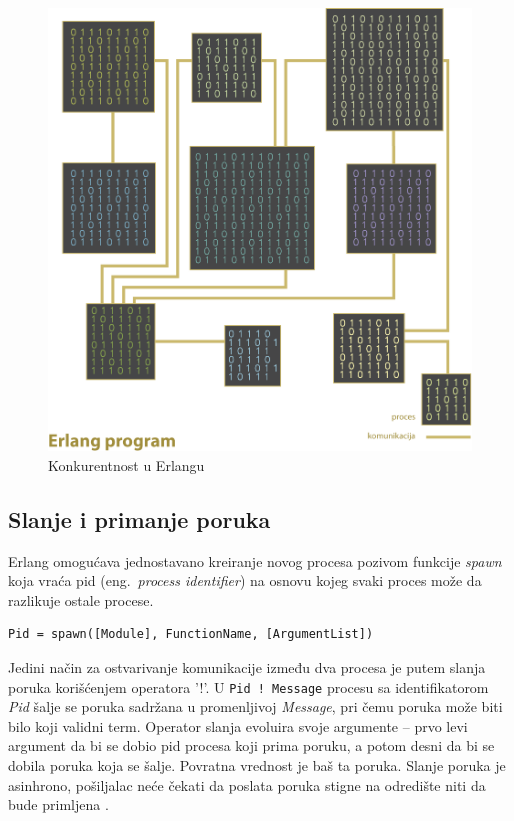 \documentclass[a4paper]{article}
\begin{document}
\begin{figure}[h!]
\begin{center}
\includegraphics[scale=0.5]{concurrency.png}
\end{center}
\caption{Konkurentnost u Erlangu}
\label{fig:concurrency}
\end{figure} 

\subsection{Slanje i primanje poruka}
Erlang omogućava jednostavano kreiranje novog procesa pozivom funkcije {\em spawn} koja vraća pid (eng.~{\em process identifier}) na osnovu kojeg svaki proces može da razlikuje ostale procese.
\begin{verbatim}
Pid = spawn([Module], FunctionName, [ArgumentList]) 
\end{verbatim}

Jedini način za ostvarivanje komunikacije između dva procesa je putem slanja poruka korišćenjem operatora '!'. U {\texttt{Pid ! Message}} procesu sa identifikatorom {\em Pid} šalje se poruka sadržana u promenljivoj {\em Message}, 
pri čemu poruka može biti bilo koji validni term. 
Operator slanja evoluira svoje argumente – prvo levi argument da bi se dobio pid procesa koji prima poruku, 
a potom desni da bi se dobila poruka koja se šalje. 
Povratna vrednost je baš ta poruka.
Slanje poruka je asinhrono, pošiljalac neće čekati da poslata poruka stigne na odredište niti da bude primljena \cite{book_joe, book_concurrent}.\\
\end{document}
